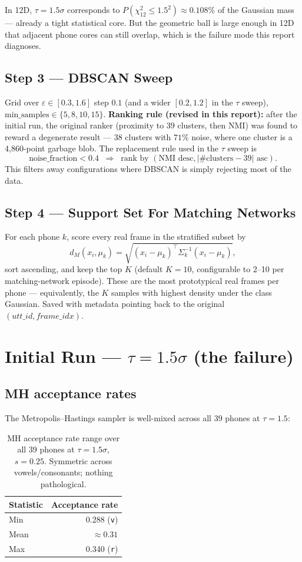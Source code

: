 \documentclass[11pt]{article}
\begin{document}
In 12D, $\tau = 1.5\sigma$ corresponds to $P(\chi^2_{12} \le 1.5^2) \approx 0.108\%$ of the Gaussian mass --- already a tight statistical core. But the geometric ball is large enough in 12D that adjacent phone cores can still overlap, which is the failure mode this report diagnoses.

\subsection*{Step 3 --- DBSCAN Sweep}

Grid over $\varepsilon \in [0.3, 1.6]$ step $0.1$ (and a wider $[0.2, 1.2]$ in the $\tau$ sweep), $\text{min\_samples} \in \{5, 8, 10, 15\}$. \textbf{Ranking rule (revised in this report):} after the initial run, the original ranker (proximity to 39 clusters, then NMI) was found to reward a degenerate result --- 38 clusters with $71\%$ noise, where one cluster is a 4{,}860-point garbage blob. The replacement rule used in the $\tau$ sweep is
\[
\text{noise\_fraction} < 0.4 \;\;\Rightarrow\;\; \text{rank by }(\text{NMI desc}, |\#\text{clusters} - 39|\text{ asc}).
\]
This filters away configurations where DBSCAN is simply rejecting most of the data.

\subsection*{Step 4 --- Support Set For Matching Networks}

For each phone $k$, score every real frame in the stratified subset by
\[
d_M(x_i, \mu_k) = \sqrt{(x_i - \mu_k)^\top \Sigma_k^{-1} (x_i - \mu_k)},
\]
sort ascending, and keep the top $K$ (default $K = 10$, configurable to 2--10 per matching-network episode). These are the most prototypical real frames per phone --- equivalently, the $K$ samples with highest density under the class Gaussian. Saved with metadata pointing back to the original $(utt\_id, frame\_idx)$.

\section*{Initial Run --- $\tau = 1.5\sigma$ (the failure)}

\subsection*{MH acceptance rates}
The Metropolis--Hastings sampler is well-mixed across all 39 phones at $\tau = 1.5$:
\begin{table}[H]
\centering
\caption{MH acceptance rate range over all 39 phones at $\tau = 1.5\sigma$, $s = 0.25$. Symmetric across vowels/consonants; nothing pathological.}
\begin{tabular}{lr}
\toprule
Statistic & Acceptance rate \\
\midrule
Min  & 0.288 (\texttt{v}) \\
Mean & $\approx 0.31$ \\
Max  & 0.340 (\texttt{r}) \\
\bottomrule
\end{tabular}
\end{table}
\end{document}
